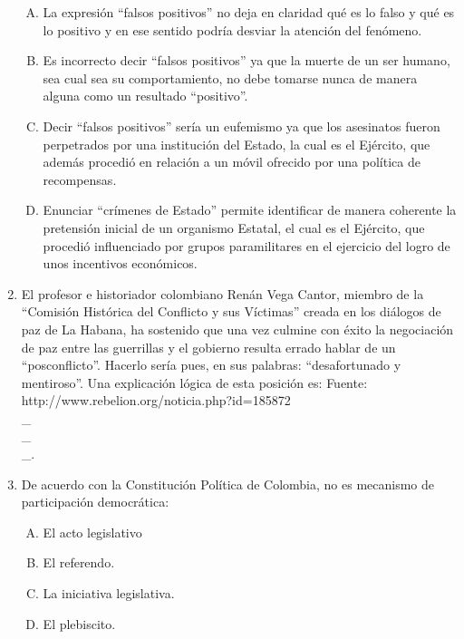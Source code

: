 \begin{enumerate}
\begin{enumerate}[(A)]
\item    La expresión ``falsos positivos'' no deja en claridad qué es lo falso y qué es lo positivo y en ese sentido podría desviar la atención del fenómeno.
 \item  Es incorrecto decir ``falsos positivos'' ya que la muerte de un ser humano, sea cual sea su comportamiento, no debe tomarse nunca de manera alguna como un resultado ``positivo''.
\item Decir ``falsos positivos'' sería un eufemismo ya que los asesinatos fueron perpetrados por una institución del Estado, la cual es el Ejército, que además procedió en relación a un móvil ofrecido por una política de recompensas. 
\item Enunciar ``crímenes de Estado'' permite identificar de manera coherente la pretensión inicial de un organismo Estatal, el cual es el Ejército, que procedió influenciado por grupos paramilitares en el ejercicio del logro de unos incentivos económicos.
\end{enumerate}



\item  El profesor e historiador colombiano Renán Vega Cantor, miembro de la ``Comisión Histórica del Conflicto y sus Víctimas'' creada en los diálogos de paz de La Habana, ha sostenido que una vez culmine con éxito la negociación de paz entre las guerrillas y el gobierno resulta errado hablar de un ``posconflicto''. Hacerlo sería pues, en sus palabras: ``desafortunado y mentiroso''. Una explicación lógica de esta posición es:\label{sociii-18} {\footnotesize Fuente: http://www.rebelion.org/noticia.php?id=185872}\hrulefill\\
\_\hrulefill\\
\_\hrulefill\\
\_\hrulefill.


\newpage
\item  De acuerdo con la Constitución Política de Colombia, no es mecanismo de participación democrática:\label{sociii-19}


\begin{enumerate}[(A)]
\item   El acto legislativo
 \item  El referendo.
\item La iniciativa legislativa.
\item El plebiscito.
\end{enumerate}



\end{enumerate}
